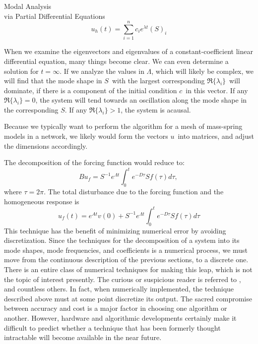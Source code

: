 \documentclass[a4paper,10pt]{report}
\numberwithin{equation}{section}
\begin{document}
{\begin{chapter}
\begin{section}{Modal Analysis \\via Partial Differential Equations}
\begin{equation}
 u_h(t) = \sum_{i=1}^n c_i e^{\lambda t} (S)_i
\end{equation}
\par
When we examine the eigenvectors and eigenvalues of a constant-coefficient linear differential equation, many things become clear. We can even determine a solution for $t = \infty$. If we analyze the values in $\Lambda$, which will likely be complex, we will find that the mode shape in $S$\  with the largest corresponding $\Re\{\lambda_i\}$\  will dominate, if there is a component of the initial condition $c$\  in this vector. If any $\Re\{\lambda_i\} = 0$, the system will tend towards an oscillation along the mode shape in the corresponding $S$. If any $\Re\{\lambda_i\} > 1$, the system is acausal. \cite[p.~318]{Strang2009}
\par
Because we typically want to perform the algorithm for a mesh of mass-spring models in a network, we likely would form the vectors $u$\  into matrices, and adjust the dimensions accordingly.\cite[p.~20]{Reid1992}
\par
The decomposition of the forcing function would reduce to:
\begin{equation}
Bu_f = S^{-1} e^{\Lambda t} \int_0^t e^{-D \tau} S f(\tau) d\tau \text{, }
\end{equation}
where $\tau = 2\pi$. The total disturbance due to the forcing function and the homogeneous response is
\begin{equation}
u_f(t) = e^{At}v(0) + S^{-1}e^{\Lambda t} \int_0^t e^{-D \tau} S f(\tau) d\tau
\end{equation}
This technique has the benefit of minimizing numerical error by avoiding discretization. Since the techniques for the decomposition of a system into its mode shapes, mode frequencies, and coefficients is a numerical process, we must move from the continuous description of the previous sections, to a discrete one. There is an entire class of numerical techniques for making this leap, which is not the topic of interest presently. The curious or suspicious reader is referred to \cite[p.~317]{Strang2009} \cite{Press1988} \cite{Reid1992} \cite{Courant1937}, and countless others. In fact, when numerically implemented, the technique described above must at some point discretize its output. The sacred compromise between accuracy and cost is a major factor in choosing one algorithm or another. However, hardware and algorithmic developments certainly make it difficult to predict whether a technique that has been formerly thought intractable will become available in the near future. 

\end{section}
\end{chapter}}
\end{document}

